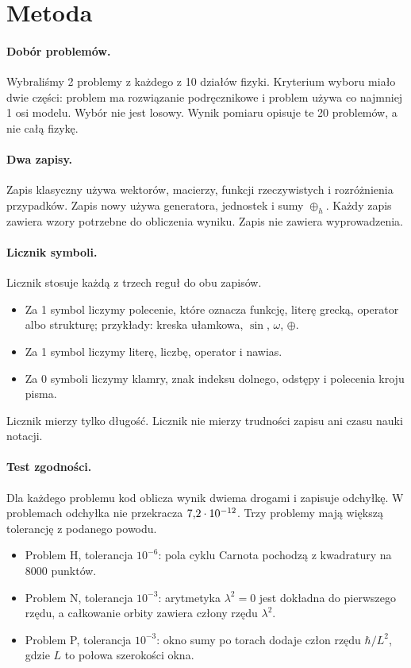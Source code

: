 \documentclass[11pt,a4paper]{article}
\newcommand{\oph}{\mathbin{\oplus_{h}}}       %
\begin{document}
\section{Metoda}
\label{sec:method}

\paragraph{Dobór problemów.}
Wybraliśmy 2 problemy z każdego z 10 działów fizyki. Kryterium wyboru miało
dwie części: problem ma rozwiązanie podręcznikowe i problem używa co najmniej
1 osi modelu. Wybór nie jest losowy. Wynik pomiaru opisuje te 20 problemów,
a nie całą fizykę.

\paragraph{Dwa zapisy.}
Zapis klasyczny używa wektorów, macierzy, funkcji rzeczywistych i rozróżnienia
przypadków. Zapis nowy używa generatora, jednostek i sumy $\oph$. Każdy zapis
zawiera wzory potrzebne do obliczenia wyniku. Zapis nie zawiera wyprowadzenia.

\paragraph{Licznik symboli.}
Licznik stosuje każdą z trzech reguł do obu zapisów.
\begin{itemize}[leftmargin=1.6em]
  \item Za 1 symbol liczymy polecenie, które oznacza funkcję, literę grecką,
        operator albo strukturę; przykłady: kreska ułamkowa, $\sin$, $\omega$,
        $\oplus$.
  \item Za 1 symbol liczymy literę, liczbę, operator i nawias.
  \item Za 0 symboli liczymy klamry, znak indeksu dolnego, odstępy i polecenia
        kroju pisma.
\end{itemize}
Licznik mierzy tylko długość. Licznik nie mierzy trudności zapisu ani
czasu nauki notacji.

\paragraph{Test zgodności.}
Dla każdego problemu kod oblicza wynik dwiema drogami i zapisuje odchyłkę.
W \gcTight{} problemach odchyłka nie przekracza $7{,}2\cdot10^{-12}$. Trzy problemy
mają większą tolerancję z podanego powodu.
\begin{itemize}[leftmargin=1.6em]
  \item Problem H, tolerancja $10^{-6}$: pola cyklu Carnota pochodzą
        z kwadratury na 8000 punktów.
  \item Problem N, tolerancja $10^{-3}$: arytmetyka $\lambda^{2}=0$ jest
        dokładna do pierwszego rzędu, a całkowanie orbity zawiera człony rzędu
        $\lambda^{2}$.
  \item Problem P, tolerancja $10^{-3}$: okno sumy po torach dodaje człon rzędu
        $\hbar/L^{2}$, gdzie $L$ to połowa szerokości okna.
\end{itemize}
\end{document}
